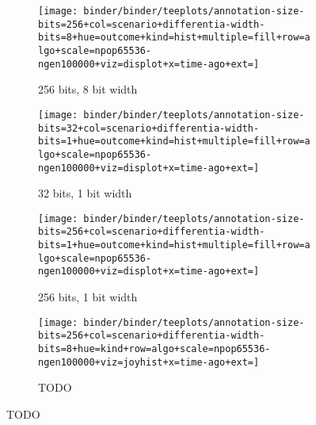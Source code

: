 \begin{figure*}
  \centering

\begin{subfigure}[b]{\textwidth}
\centering
\texttt{[image: binder/binder/teeplots/annotation-size-bits=256+col=scenario+differentia-width-bits=8+hue=outcome+kind=hist+multiple=fill+row=algo+scale=npop65536-ngen100000+viz=displot+x=time-ago+ext=]}
\caption{256 bits, 8 bit width}
\end{subfigure}

\begin{subfigure}[b]{\textwidth}
\centering
\texttt{[image: binder/binder/teeplots/annotation-size-bits=32+col=scenario+differentia-width-bits=1+hue=outcome+kind=hist+multiple=fill+row=algo+scale=npop65536-ngen100000+viz=displot+x=time-ago+ext=]}
\caption{32 bits, 1 bit width}
\end{subfigure}

\begin{subfigure}[b]{\textwidth}
  \centering
  \texttt{[image: binder/binder/teeplots/annotation-size-bits=256+col=scenario+differentia-width-bits=1+hue=outcome+kind=hist+multiple=fill+row=algo+scale=npop65536-ngen100000+viz=displot+x=time-ago+ext=]}
  \caption{256 bits, 1 bit width}
  \end{subfigure}

  \begin{subfigure}[b]{\textwidth}
    \centering
    \texttt{[image: binder/binder/teeplots/annotation-size-bits=256+col=scenario+differentia-width-bits=8+hue=kind+row=algo+scale=npop65536-ngen100000+viz=joyhist+x=time-ago+ext=]}
    \caption{TODO}
  \end{subfigure}%
  \caption{TODO}
  \label{fig:recency-structure}

\end{figure*}
